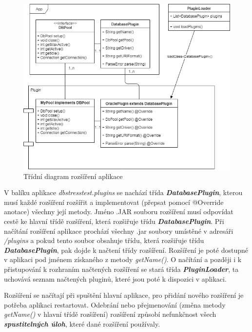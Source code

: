 \documentclass[czech,bachelor,public,dept460,male,cpdeclaration,twoside]{diploma}
\begin{document}
\newpage
\begin{figure}[!htbp]\centering\includegraphics[width=1.0\textwidth]{Figures/plugins.png}\caption{Třídní diagram rozšíření aplikace}
\label{pluginsdiag}
\end{figure}

V balíku aplikace \textit{dbstresstest.plugins} se nachází třída \textbf{\emph{DatabasePlugin}}, kterou musí každé rozšíření rozšířit a implementovat (přepsat pomocí @Override anotace) všechny její metody. Jméno .JAR souboru rozšíření musí odpovídat cestě ke hlavní třídě rozšíření, která rozšiřuje třídu \textbf{\emph{DatabasePlugin}}. Při načítání rozšíření aplikace prochází všechny .jar soubory umístěné v adresáři \textit{/plugins} a pokud tento soubor obsahuje třídu, která rozšiřuje třídu \textbf{\emph{DatabasePlugin}}, pak dojde k načtení třídy rozšíření. Rozšíření je poté dostupné v aplikaci pod jménem získaného z metody \textit{getName()}. O načítání a později i k přistupování k rozhraním načtených rozšíření se stará třída \textbf{\emph{PluginLoader}}, ta uchovává seznam načtených pluginů, které jsou poté k dispozici v aplikaci.

Rozšíření se načítají při spuštění hlavní aplikace, pro přidání nového rozšíření je potřeba aplikaci restartovat. Odebrání nebo přejmenování (změna metody \textit{getName()} v hlavní třídě rozšíření) rozšíření způsobí nefunkčnost všech \textbf{\emph{spustitelných úloh}}, které dané rozšíření používaly.



\newpage
\end{document}

